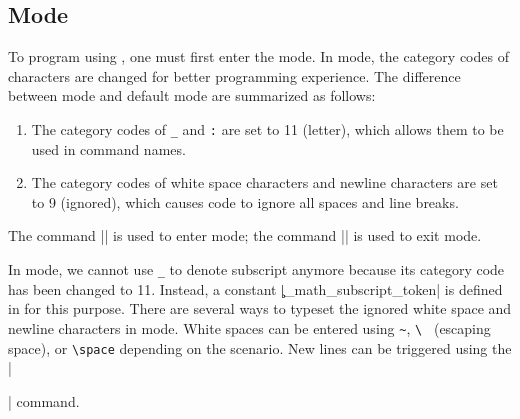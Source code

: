 \documentclass{ltugboat}
\begin{document}
%
%
%


\subsection{\LTT{} Mode}


To program using \LTT{}, one must first enter the \LTT{} mode.
In \LTT{} mode, the category codes of characters are changed for better programming experience.
The difference between \LTT{} mode and default \LT{} mode are summarized as follows:
\begin{enumerate}
    \item The category codes of \verb|_| and \verb|:| are set to 11 (letter), which allows them to be used in command names.
    \item The category codes of white space characters and newline characters are set to 9 (ignored), which causes \LTT{} code to ignore all spaces and line breaks.
\end{enumerate}
The command \inltex|\ExplSyntaxOn| is used to enter \LTT{} mode; the command \inltex|\ExplSyntaxOff| is used to exit \LTT{} mode.

In \LTT{} mode, we cannot use \verb|_| to denote subscript anymore because its category code has been changed to 11. Instead, a constant \inltex|\c_math_subscript_token| is defined in \LTT{} for this purpose.
There are several ways to typeset the ignored white space and newline characters in \LTT{} mode.
White spaces can be entered using \verb|~|, \verb|\ | (escaping space), or \verb|\space| depending on the scenario.
New lines can be triggered using the \inltex|\par| command.
\end{document}
